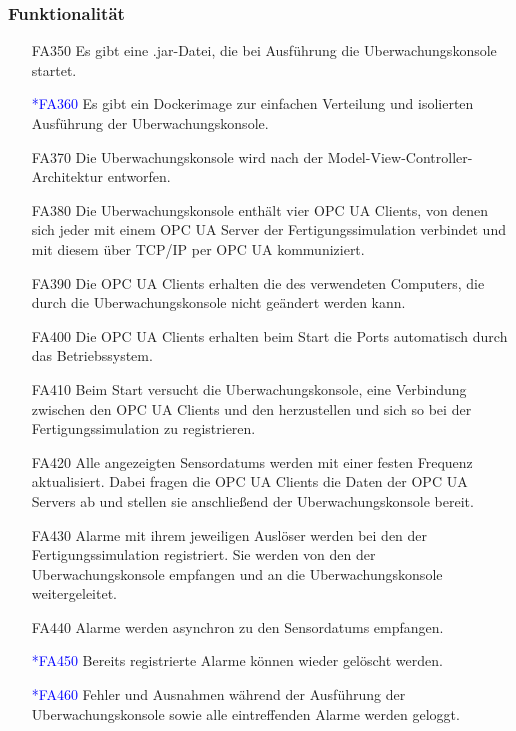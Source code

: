 \documentclass[parskip=full]{scrartcl}
\begin{document}
\subsubsection{Funktionalität}
\begin{enumerate}
  \item[FA350] Es gibt eine .jar-Datei, die bei Ausführung die \gls{Uberwachungskonsole} startet.
  \item[\textcolor{blue}{*FA360}] Es gibt ein \gls{Dockerimage} zur einfachen Verteilung und isolierten Ausführung der \gls{Uberwachungskonsole}.
  \item[FA370] Die \gls{Uberwachungskonsole} wird nach der Model-View-Controller-Architektur entworfen.
  \item[FA380] Die \gls{Uberwachungskonsole} enthält vier \glspl{OPC UA Client}, von denen sich jeder mit einem \gls{OPC UA Server} der \gls{Fertigungssimulation} verbindet und mit diesem über \gls{TCP/IP} per
    \gls{OPC  UA} kommuniziert.
  \item[FA390] Die \glspl{OPC UA Client} erhalten die  des verwendeten Computers,
  die durch die \gls{Uberwachungskonsole} nicht geändert werden kann.
  \item[FA400] Die \glspl{OPC UA Client} erhalten beim Start die Ports automatisch durch das Betriebssystem.
  \item[FA410] Beim Start versucht die \gls{Uberwachungskonsole}, eine Verbindung zwischen den \glspl{OPC UA Client} und den  herzustellen und sich so bei der
    \gls{Fertigungssimulation} zu registrieren.
  \item[FA420] Alle angezeigten \glspl{Sensordatum} werden mit einer festen Frequenz aktualisiert. Dabei fragen die \glspl{OPC UA Client} die Daten der \glspl{OPC UA Server}
    ab und stellen sie anschlie{\ss}end der \gls{Uberwachungskonsole} bereit.
  \item[FA430] Alarme mit ihrem jeweiligen Auslöser werden bei den  der \gls{Fertigungssimulation} registriert. Sie werden von den
     der \gls{Uberwachungskonsole} empfangen und an die \gls{Uberwachungskonsole} weitergeleitet.
  \item[FA440] Alarme werden asynchron zu den \glspl{Sensordatum} empfangen.
  \item[\textcolor{blue}{*FA450}] Bereits registrierte Alarme können wieder gelöscht werden.
  \item[\textcolor{blue}{*FA460}] Fehler und Ausnahmen während der Ausführung der \gls{Uberwachungskonsole} sowie alle eintreffenden Alarme werden geloggt.
\end{enumerate}
\end{document}
